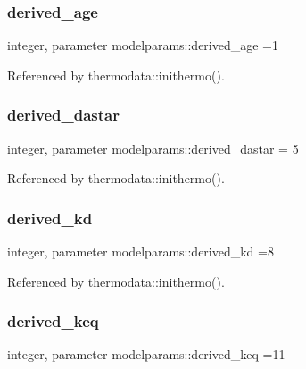 \subsubsection{\texorpdfstring{derived\+\_\+age}{derived\_age}}
{\footnotesize\ttfamily integer, parameter modelparams\+::derived\+\_\+age =1}



Referenced by thermodata\+::inithermo().

\mbox{\label{namespacemodelparams_a81273461b08fe58e73e36d844c62fe7f}} 
\subsubsection{\texorpdfstring{derived\+\_\+dastar}{derived\_dastar}}
{\footnotesize\ttfamily integer, parameter modelparams\+::derived\+\_\+dastar = 5}



Referenced by thermodata\+::inithermo().

\mbox{\label{namespacemodelparams_a709313f88097e1ea1da03d031977d39d}} 
\subsubsection{\texorpdfstring{derived\+\_\+kd}{derived\_kd}}
{\footnotesize\ttfamily integer, parameter modelparams\+::derived\+\_\+kd =8}



Referenced by thermodata\+::inithermo().

\mbox{\label{namespacemodelparams_a9158352b05bd5c94db9c9f39b728b8af}} 
\subsubsection{\texorpdfstring{derived\+\_\+keq}{derived\_keq}}
{\footnotesize\ttfamily integer, parameter modelparams\+::derived\+\_\+keq =11}



